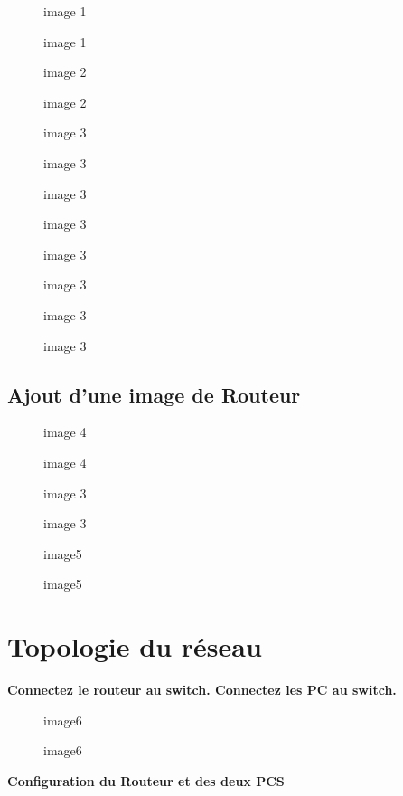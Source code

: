 \documentclass[
]{article}
\begin{document}
\begin{figure}
\centering
{image 1}
\caption{image 1}
\end{figure}

\begin{figure}
\centering
{image 2}
\caption{image 2}
\end{figure}

\begin{figure}
\centering
{image 3}
\caption{image 3}
\end{figure}

\begin{figure}
\centering
{image 3}
\caption{image 3}
\end{figure}

\begin{figure}
\centering
{image 3}
\caption{image 3}
\end{figure}

\begin{figure}
\centering
{image 3}
\caption{image 3}
\end{figure}

\subsection{Ajout d’une image de
Routeur}\label{ajout-dune-image-de-routeur}

\begin{figure}
\centering
{image 4}
\caption{image 4}
\end{figure}

\begin{figure}
\centering
{image 3}
\caption{image 3}
\end{figure}

\begin{figure}
\centering
{image5}
\caption{image5}
\end{figure}

\section{Topologie du réseau}\label{topologie-du-ruxe9seau}

\textbf{Connectez le routeur au switch. Connectez les PC au switch.}

\begin{figure}
\centering
{image6}
\caption{image6}
\end{figure}

\textbf{Configuration du Routeur et des deux PCS}
\end{document}
